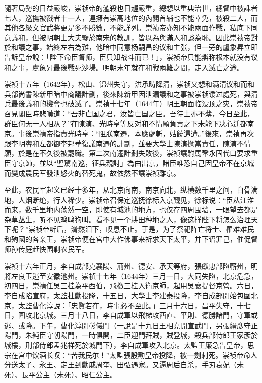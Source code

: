 隨著局勢的日益嚴峻，崇祯帝的濫殺也日趨嚴重，總想以重典治世，總督中被誅者七人，巡撫被戮者十一人，連擁有崇高地位的內閣首辅也不能幸免，被殺二人，而其他各級文官武將更是多不勝數，不能詳列。崇祯帝亦知不能兩面作戰，私底下同意議和，但被明朝士大夫鑒於南宋的教訓，皆以為與滿人和談為恥。因此崇祯帝對於和議之事，始終左右為難，他暗中同意杨嗣昌的议和主张，但一旁的盧象昇立即告訴皇帝說：「陛下命臣督师，臣只知战斗而已！」，崇祯帝只能辯称根本就没有议和之事，盧象昇最後戰死沙場。明朝末年就在和戰兩難之間，走入滅亡之途。

崇禎十五年（1642年），松山、锦州失守，洪承畴降清，崇祯又想和满清议和而和兵部尚書陳新甲暗中商議計劃，後來陳新甲因泄漏議和之事被崇祯诿过處死，與清兵最後議和的機會也破滅了。崇禎十七年（1644年）明王朝面临没顶之灾，崇祯帝召見閣臣時悲嘆道：“吾非亡国之君，汝皆亡国之臣。吾待士亦不薄，今日至此，群臣何无一人相从？”在陳演、光時亨等反对和不情願負責之下未能下决心迁都南京。事後崇禎帝指責光時亨：“阻朕南遷，本應處斬，姑饒這遭。”後來，崇禎再次跟李明睿和左都御李邦華復議南遷的計劃，並要大學士陳演擔當責任，陳演不情願，於是在不久後被罷職。第二次南遷計劃失敗後，崇禎讓駙馬鞏永固代口要求重臣守京師，並以“聖駕南巡，征兵親討」為由出京，諸臣唯恐自己因皇帝不在京城而變成農民军發泄怒火的替死鬼，故依然不讓崇禎離京。

至此，农民军起义已经十多年，从北京向南，南京向北，纵横数千里之间，白骨满地，人烟断绝，行人稀少。崇祯帝召保定巡抚徐标入京觐见，徐标说：“臣从江淮而来，数千里地内荡然一空，即使有城池的地方，也仅存四周围墙，一眼望去都是杂草丛生，听不见鸡鸣狗叫。看不见一个耕田种地之人，像这样陛下将怎么治理天下呢？”崇祯帝听后，潸然泪下，叹息不止。于是，为了祭祀阵亡将士、罹难难民和殉國的各亲王，崇祯帝便在宫中大作佛事来祈求天下太平，并下诏罪己，催促督师孙传庭赶快围剿农民军。

崇禎十六年正月，李自成部克襄陽、荊州、德安、承天等府，張獻忠部陷蘄州，明將左良玉逃至安徽池州。崇禎十七年（1644年）三月一日，大同失陷，北京危急，初四日，崇禎任吳三桂為平西伯，飛檄三桂入衛京師，起用吳襄提督京營。六日，李自成陷宣府，太監杜勳投降，十五日，大學士李建泰投降，李自成部開始包圍北京，太監曹化淳說：「忠賢若在，時事必不至此。」三月十六日，昌平失守，十七日，圍攻北京城。三月十八日，李自成軍以飛梯攻西直、平則、德勝諸門，守軍或逃、或降。下午，曹化淳開彰儀門（一說是十九日王相堯開宣武門，另張縉彥守正陽門，朱純臣守朝陽門，一時俱開，二臣迎門拜賊，賊登城，殺兵部侍郎王家彥於城樓，刑部侍郎孟兆祥死於城門下），李自成軍攻入北京。太監王廉急告皇帝，思宗在宫中饮酒长叹：“苦我民尔！”太監張殷勸皇帝投降，被一劍刺死。崇祯帝命人分送太子、永王、定王到勳戚周奎、田弘遇家。又逼周后自杀，手刃袁妃（未死）、長平公主（未死）、昭仁公主。

